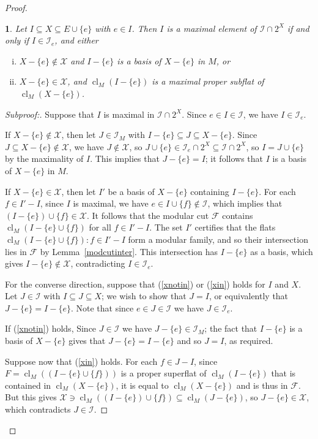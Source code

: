 \documentclass{amsart}
\theoremstyle{plain}
\newtheorem{claim}{}[theorem]
\theoremstyle{definition}
\newcommand{\cF}{\mathcal{F}}
\newcommand{\cI}{\mathcal{I}}
\newcommand{\cX}{\mathcal{X}}
\DeclareMathOperator{\cl}{cl}
\renewcommand{\ss}{\subseteq}
\newenvironment{subproof}[1][\proofname]{%
  \renewcommand{\qedsymbol}{$\blacksquare$}%
  \begin{proof}[Subproof:]%
}{%
  \end{proof}%
}
\begin{document}
\begin{proof}
  \begin{claim}\label{foo2}
    Let $I \ss X \ss E \cup \{e\}$ with $e \in I$. Then $I$ is a maximal element of 
    $\cI \cap 2^X$ if and only if $I \in \cI_e$, and either 
    \begin{enumerate}[(i)]
      \item\label{xnotin} $X - \{e\} \notin \cX$ and $I - \{e\}$ is a basis of $X - \{e\}$ in $M$, or
      \item\label{xin} $X - \{e\} \in \cX$, and $\cl_M(I-\{e\})$ is a maximal proper subflat of $\cl_M(X - \{e\})$. 
    \end{enumerate}
  \end{claim}
  \begin{subproof}
    Suppose that $I$ is maximal in $\cI \cap 2^X$. Since $e \in I \in \cI$, 
    we have $I \in \cI_e$. 
    
    If $X - \{e\} \notin \cX$, then let $J \in \cI_M$ with
    $I - \{e\} \ss J \ss X - \{e\}$. Since $J \ss X - \{e\} \notin \cX$, 
    we have $J \notin \cX$, so $J \cup \{e\} \in \cI_e \cap 2^X \ss \cI \cap 2^X$, 
    so $I = J \cup \{e\}$ by the maximality of $I$. This implies that $J - \{e\} = I$; 
    it follows that $I$ is a basis of $X - \{e\}$ in $M$. 

    If $X - \{e\} \in \cX$, then let $I'$ be a basis of $X - \{e\}$ containing $I - \{e\}$. 
    For each $f \in I' - I$, since $I$ is maximal, we have $e \in I \cup \{f\} \notin \cI$, 
    which implies that $(I - \{e\}) \cup \{f\} \in \cX$. It follows that the modular cut 
    $\cF$ contains $\cl_M(I - \{e\} \cup \{f\})$ for all $f \in I' - I$. The set $I'$ 
    certifies that the flats $\cl_M(I - \{e\} \cup \{f\}) : f \in I' - I$ form a modular 
    family, and so their intersection lies in $\cF$ by Lemma~\ref{modcutinter}.
    This intersection has $I - \{e\}$ as a basis, which gives $I - \{e\} \notin \cX$, contradicting $I \in \cI_e$. 

    For the converse direction, suppose that (\ref{xnotin}) or (\ref{xin}) holds for $I$ and $X$. Let $J \in \cI$ with $I \ss J \ss X$; we wish to show that $J = I$, or equivalently 
    that $J - \{e\} = I - \{e\}$. Note that since $e \in J \in \cI$ we have $J \in \cI_e$. 
    
    If (\ref{xnotin}) holds, 
    Since $J \in \cI$ we have $J - \{e\} \in \cI_M$; 
    the fact that $I - \{e\}$ is a basis of $X - \{e\}$ gives that $J - \{e\} = I - \{e\}$ 
    and so $J = I$, as required. 

    Suppose now that (\ref{xin}) holds. For each $f \in J - I$, 
    since $F = \cl_M((I - \{e\} \cup \{f\}))$ is a proper superflat of $\cl_M(I - \{e\})$ 
    that is contained in $\cl_M(X - \{e\})$, it is equal to $\cl_M(X - \{e\})$ 
    and is thus in $\cF$. But this gives 
    $\cX \ni \cl_M((I - \{e\}) \cup \{f\}) \ss \cl_M(J - \{e\})$, 
    so $J - \{e\} \in \cX$, which contradicts $J \in \cI$. 
  \end{subproof}


\end{proof}
\end{document}
